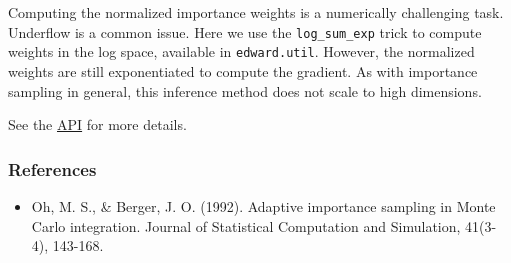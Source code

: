 Computing the normalized importance weights is a numerically
challenging task.  Underflow is a common issue. Here we use the
\texttt{log_sum_exp} trick to compute weights in the log space,
available in \texttt{edward.util}. However, the normalized weights are
still exponentiated to compute the gradient. As with importance
sampling in general, this inference method does not scale to high
dimensions.

See the \href{api/}{API} for more details.

\subsubsection{References}\label{references}

\begin{itemize}
\item
  Oh, M. S., & Berger, J. O. (1992). Adaptive importance sampling in
  Monte Carlo integration. Journal of Statistical Computation and
  Simulation, 41(3-4), 143-168.
\end{itemize}
